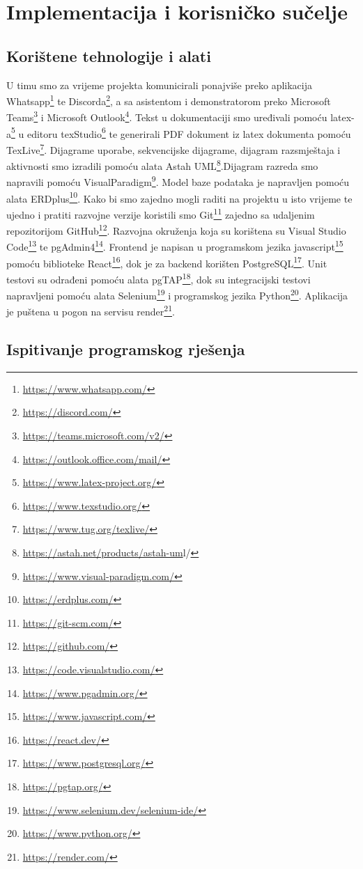 \chapter{Implementacija i korisničko sučelje}

		\section{Korištene tehnologije i alati}

			 U timu smo za vrijeme projekta komunicirali ponajviše preko aplikacija Whatsapp\footnote{\url{https://www.whatsapp.com/}} te Discorda\footnote{\url{https://discord.com/}}, a sa asistentom i demonstratorom preko Microsoft Teams\footnote{\url{https://teams.microsoft.com/v2/}} i Microsoft Outlook\footnote{\url{https://outlook.office.com/mail/}}. Tekst u dokumentaciji smo uređivali pomoću latex-a\footnote{\url{https://www.latex-project.org/}} u editoru texStudio\footnote{\url{https://www.texstudio.org/}} te generirali PDF dokument iz latex dokumenta pomoću TexLive\footnote{\url{https://www.tug.org/texlive/}}. Dijagrame uporabe, sekvencijske dijagrame, dijagram razsmještaja i aktivnosti smo izradili pomoću alata Astah UML\footnote{\url{https://astah.net/products/astah-um}l/}.Dijagram razreda smo napravili pomoću VisualParadigm\footnote{\url{https://www.visual-paradigm.com/}}. Model baze podataka je napravljen pomoću alata ERDplus\footnote{\url{https://erdplus.com/}}. Kako bi smo zajedno mogli raditi na projektu u isto vrijeme te ujedno i pratiti razvojne verzije koristili smo Git\footnote{\url{https://git-scm.com/}} zajedno sa udaljenim repozitorijom GitHub\footnote{\url{https://github.com/}}. Razvojna okruženja koja su korištena su Visual Studio Code\footnote{\url{https://code.visualstudio.com/}} te pgAdmin4\footnote{\url{https://www.pgadmin.org/}}. Frontend je napisan u programskom jezika javascript\footnote{\url{https://www.javascript.com/}} pomoću biblioteke React\footnote{\url{https://react.dev/}}, dok je za backend korišten PostgreSQL\footnote{\url{https://www.postgresql.org/}}. Unit testovi su odrađeni pomoću alata pgTAP\footnote{\url{https://pgtap.org/}}, dok su integracijski testovi napravljeni pomoću alata Selenium\footnote{\url{https://www.selenium.dev/selenium-ide/}} i programskog  jezika Python\footnote{\url{https://www.python.org/}}.
			 Aplikacija je puštena u pogon na servisu render\footnote{\url{https://render.com/}}.
			\eject 
		
	
		\section{Ispitivanje programskog rješenja}
			
